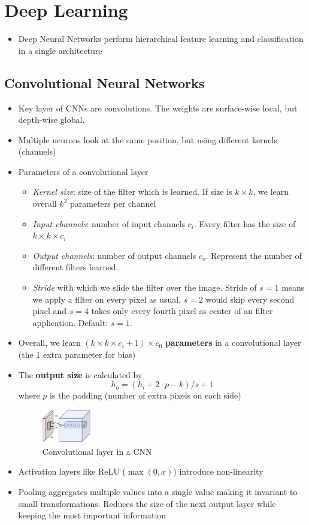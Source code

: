 \section{Deep Learning}
\begin{itemize}
	\item Deep Neural Networks perform hierarchical feature learning and classification in a single architecture
\end{itemize}
\subsection{Convolutional Neural Networks}
\begin{itemize}
	\item Key layer of CNNs are convolutions. The weights are surface-wise local, but depth-wise global.
	\item Multiple neurons look at the same position, but using different kernels (channels)
	\item Parameters of a convolutional layer
	\begin{itemize}
		\item \textit{Kernel size}: size of the filter which is learned. If size is $k\times k$, we learn overall $k^2$ parameters per channel
		\item \textit{Input channels}: number of input channels $c_i$. Every filter has the size of $k\times k\times c_i$
		\item \textit{Output channels}: number of output channels $c_o$. Represent the number of different filters learned.
		\item \textit{Stride} with which we slide the filter over the image. Stride of $s=1$ means we apply a filter on every pixel as usual, $s=2$ would skip every second pixel and $s=4$ takes only every fourth pixel as center of an filter application. Default: $s=1$.
	\end{itemize}
	\item Overall, we learn $(k\times k\times c_i + 1)\times c_0$ \textbf{parameters} in a convolutional layer (the 1 extra parameter for bias)
	\item The \textbf{output size} is calculated by $$h_o = (h_i + 2\cdot p - k) / s + 1$$ where $p$ is the padding (number of extra pixels on each side)
	\begin{figure}[ht!]
		\centering
		\includegraphics[width=0.2\textwidth]{figures/cv_deep_learning_convolution_operator.png}
		\caption{Convolutional layer in a CNN}
	\end{figure}
	\item Activation layers like ReLU ($\max(0,x)$) introduce non-linearity
	\item Pooling aggregates multiple values into a single value making it invariant to small transformations. Reduces the size of the next output layer while keeping the most important information 
\end{itemize}
